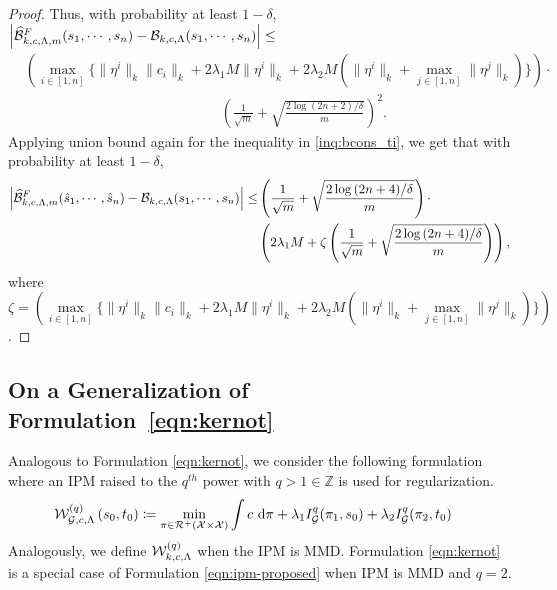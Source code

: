 \begin{proof}
\noindent Thus, with probability at least $1-\delta$, $\left|\widehat{\mathcal{B}}^F_{k,c,\Lambda, m}(s_1, \cdots, s_n)-\mathcal{B}_{k, c, \Lambda}(s_1, \cdots, s_n)\right| \leq$
\begin{align*}
 &\left(\max\limits_{i\in[1, n]}\Big\{\|\eta^i\|_k\|c_i\|_k+2\lambda_1M\|\eta^i\|_k+2\lambda_2M(\|\eta^i\|_k+\max\limits_{j\in [1, n]}\|\eta^j\|_k)\Big\}\right)\cdot \\
&\qquad\qquad\qquad\qquad\qquad\qquad\qquad\left(\frac{1}{\sqrt{m}}+\sqrt{\frac{2\log{(2n+2)/\delta}}{m}}\right)^2.
\end{align*}
Applying union bound again for the inequality in \ref{inq:bcons_ti}, we get that with probability at least $1-\delta$, \begin{align*}\left|\widehat{\mathcal{B}}^F_{k,c,\Lambda, m}(\hat{s}_1, \cdots, \hat{s}_n)-\mathcal{B}_{k, c, \Lambda}(s_1, \cdots, s_n)\right|\leq &\left(\frac{1}{\sqrt{m}}+\sqrt{\frac{2\log{(2n+4)/\delta}}{m}}\right)\cdot \\&\left(2\lambda_1M+ \zeta \left(\frac{1}{\sqrt{m}}+\sqrt{\frac{2\log{(2n+4)/\delta}}{m}}\right)\right),\end{align*} where $\zeta=\left(\max\limits_{i\in[1, n]}\Big\{\|\eta^i\|_k\|c_i\|_k+2\lambda_1M\|\eta^i\|_k+2\lambda_2M(\|\eta^i\|_k+\max\limits_{j\in [1, n]}\|\eta^j\|_k)\Big\}\right)$.
\end{proof}

\subsection[On a Generalized Formulation of OT with IPM Regularization raised to $q(\in \mathbb{N})$.]{On a Generalization of Formulation~\ref{eqn:kernot}}\label{sec:ipmq}
Analogous to Formulation \ref{eqn:kernot}, we consider the following formulation where an IPM raised to the $q^{th}$ power with $q> 1\in\mathbb{Z}$ is used for regularization. 
\begin{align}\label{eqn:ipm-proposed}
\mathcal{W}_{\mathcal{G}, c, \Lambda}^{(q)}\left(s_0,t_0\right) &\coloneqq \min\limits_{\pi\in\mathcal{R}^+\left(\mathcal{X}\times\mathcal{X}\right)} \int c ~\textup{d}\pi + \lambda_1  I_{\mathcal{G}}^q(\pi_1, s_0) + \lambda_2  I_{\mathcal{G}}^q(\pi_2,t_0)
\end{align}
Analogously, we define $\mathcal{W}_{k, c, \Lambda}^{(q)}$ when the IPM is MMD. Formulation \ref{eqn:kernot} is a special case of Formulation \ref{eqn:ipm-proposed} when IPM is MMD and $q=2$.

